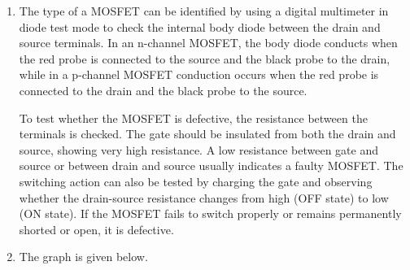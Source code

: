 \documentclass[11pt]{article}
\begin{document}
\begin{enumerate}[leftmargin=*,label=\textbf{\arabic*.}]

\item The type of a MOSFET can be identified by using a digital multimeter in diode test mode to check the internal body diode between the drain and source terminals. In an n-channel MOSFET, the body diode conducts when the red probe is connected to the source and the black probe to the drain, while in a p-channel MOSFET conduction occurs when the red probe is connected to the drain and the black probe to the source.

To test whether the MOSFET is defective, the resistance between the terminals is checked. The gate should be insulated from both the drain and source, showing very high resistance. A low resistance between gate and source or between drain and source usually indicates a faulty MOSFET. The switching action can also be tested by charging the gate and observing whether the drain-source resistance changes from high (OFF state) to low (ON state). If the MOSFET fails to switch properly or remains permanently shorted or open, it is defective.

\item The graph is given below.

\begin{center}


\end{center}
\end{enumerate}
\end{document}
